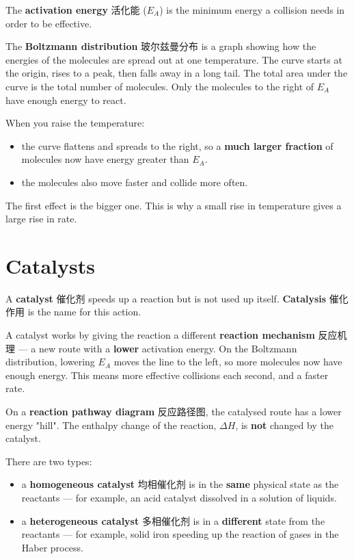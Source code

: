 \documentclass[11pt]{article}
\begin{document}
The \textbf{activation energy} 活化能 ($E_A$) is the minimum energy a collision needs in order to be effective.

The \textbf{Boltzmann distribution} 玻尔兹曼分布 is a graph showing how the energies of the molecules are spread out at one temperature. The curve starts at the origin, rises to a peak, then falls away in a long tail. The total area under the curve is the total number of molecules. Only the molecules to the right of $E_A$ have enough energy to react.

When you raise the temperature:

\begin{itemize}
\item the curve flattens and spreads to the right, so a \textbf{much larger fraction} of molecules now have energy greater than $E_A$.

\item the molecules also move faster and collide more often.

\end{itemize}

The first effect is the bigger one. This is why a small rise in temperature gives a large rise in rate.

\section*{Catalysts}

A \textbf{catalyst} 催化剂 speeds up a reaction but is not used up itself. \textbf{Catalysis} 催化作用 is the name for this action.

A catalyst works by giving the reaction a different \textbf{reaction mechanism} 反应机理 — a new route with a \textbf{lower} activation energy. On the Boltzmann distribution, lowering $E_A$ moves the line to the left, so more molecules now have enough energy. This means more effective collisions each second, and a faster rate.

On a \textbf{reaction pathway diagram} 反应路径图, the catalysed route has a lower energy "hill". The enthalpy change of the reaction, $\Delta H$, is \textbf{not} changed by the catalyst.

There are two types:

\begin{itemize}
\item a \textbf{homogeneous catalyst} 均相催化剂 is in the \textbf{same} physical state as the reactants — for example, an acid catalyst dissolved in a solution of liquids.

\item a \textbf{heterogeneous catalyst} 多相催化剂 is in a \textbf{different} state from the reactants — for example, solid iron speeding up the reaction of gases in the Haber process.

\end{itemize}
\end{document}
